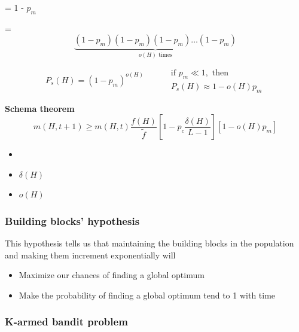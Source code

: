 \noindent {} = 1 - $p_m$

\vspace{1em}

\noindent {} =
\[
\underbrace{(1 - p_m)(1 - p_m)(1 - p_m) \dots (1 - p_m)}_{o(H) \text{ times}}
\]

\vspace{1em}

\[
P_s(H) = (1 - p_m)^{o(H)} \quad \quad 
\begin{aligned}
&\text{if } p_m \ll 1, \text{ then} \\
&P_s(H) \approx 1 - o(H) p_m
\end{aligned}
\]

\noindent \textbf{Schema theorem}
\[
m(H, t+1) \geq m(H, t) \frac{f(H)}{\tilde{f}} \left[ 1 - p_c \frac{\delta(H)}{L-1} \right] \left[ 1 - o(H) p_m \right]
\]

\vspace{1.5em}

\noindent {}
\begin{itemize}
    \item[$-$] 
    \item[$-$]  $\delta(H)$\text{)}
    \item[$-$]  $o(H)$\text{)}
\end{itemize}


\noindent {}


\subsubsection{Building blocks' hypothesis}

This hypothesis tells us that maintaining the building blocks in the population and making them increment exponentially will
\begin{itemize}
    \item Maximize our chances of finding a global optimum
    \item Make the probability of finding a global optimum tend to 1 with time
\end{itemize}


\subsubsection{K-armed bandit problem}

